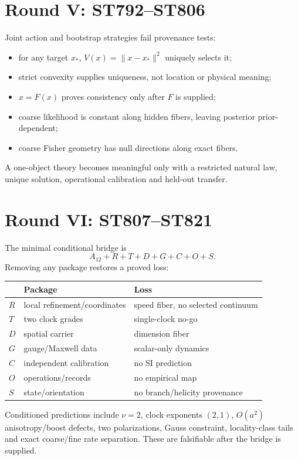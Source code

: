 \documentclass[11pt,a4paper]{article}
\begin{document}
\section{Round V: ST792--ST806}
Joint action and bootstrap strategies fail provenance tests:
\begin{itemize}
\item for any target $x_*$, $V(x)=\|x-x_*\|^2$ uniquely selects it;
\item strict convexity supplies uniqueness, not location or physical meaning;
\item $x=F(x)$ proves consistency only after $F$ is supplied;
\item coarse likelihood is constant along hidden fibers, leaving posterior prior-dependent;
\item coarse Fisher geometry has null directions along exact fibers.
\end{itemize}
A one-object theory becomes meaningful only with a restricted natural law, unique solution, operational calibration and held-out transfer.

\section{Round VI: ST807--ST821}
The minimal conditional bridge is
\[
\boxed{A_{12}+R+T+D+G+C+O+S}.
\]
Removing any package restores a proved loss:
\begin{longtable}{@{}p{}p{}p{}@{}}\toprule&Package&Loss\\\midrule\endhead
$R$&local refinement/coordinates&speed fiber, no selected continuum\\
$T$&two clock grades&single-clock no-go\\
$D$&spatial carrier&dimension fiber\\
$G$&gauge/Maxwell data&scalar-only dynamics\\
$C$&independent calibration&no SI prediction\\
$O$&operations/records&no empirical map\\
$S$&state/orientation&no branch/helicity provenance\\\bottomrule\end{longtable}

Conditioned predictions include $\nu=2$, clock exponents $(2,1)$, $O(a^2)$ anisotropy/boost defects, two polarizations, Gauss constraint, locality-class tails and exact coarse/fine rate separation. These are falsifiable after the bridge is supplied.
\end{document}
